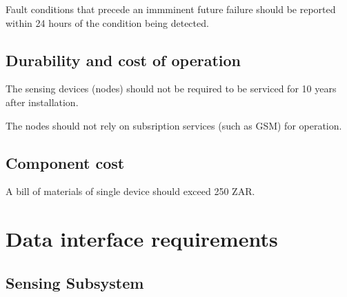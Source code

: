 \documentclass[12pt]{article}
\begin{document}
Fault conditions that  precede an immminent future failure should be reported within 24 hours of the condition being
detected.

\subsection{Durability and cost of operation}
The sensing devices (nodes) should not be required to be serviced for 10 years after installation.

The nodes should not rely on subsription services (such as GSM) for operation.

\subsection{Component cost}
A bill of materials of single device should exceed 250 ZAR.

\newpage
\section{Data interface requirements}
\subsection{Sensing Subsystem} 
\end{document}

